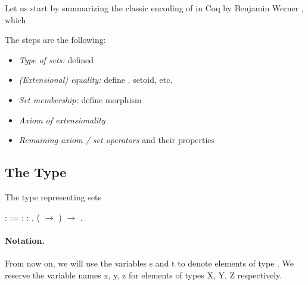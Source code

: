 
Let us start by summarizing the classic encoding of \ZF{} in Coq by Benjamin Werner \cite{DBLP:conf/tacs/Werner97}\footnotemark{}, which 


The steps are the following:
\begin{itemize}
  \item \emph{Type of sets:} defined \footnotemark{}
  \item \emph{(Extensional) equality:} define . setoid, etc.
  \item \emph{Set membership:} define  morphism
  \item \emph{Axiom of extensionality}
  \item \emph{Remaining axiom / set operators} and their properties
\end{itemize}


\subsection{The Type \texorpdfstring{}{SET}}
The type representing sets

\begin{coqdoccode}
\coqdocnoindent
{}  :  :=\coqdoceol
\coqdocindent{2.00em}
 : \coqdockw{\ensuremath{\forall}}  : , ( \ensuremath{\rightarrow} ) \ensuremath{\rightarrow} .\coqdoceol
\coqdocemptyline
\end{coqdoccode}


\noindent\paragraph{Notation.} From now on, we will use the variables \var s and \var t to denote elements of type . We reserve the variable names \var x, \var y, \var z for elements of types \var X, \var Y, \var Z respectively.

